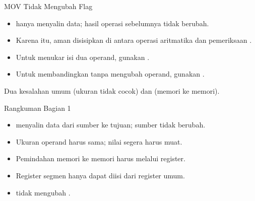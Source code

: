 \documentclass[aspectratio=169,11pt]{beamer}
\begin{document}
\begin{frame}{MOV Tidak Mengubah Flag}
\small
\begin{itemize}
    \item {} hanya menyalin data;  hasil operasi
          sebelumnya tidak berubah.

    \vspace{0.18em}
    \item Karena itu,  aman disisipkan di antara operasi
          aritmatika dan pemeriksaan .

    \vspace{0.18em}
    \item Untuk menukar isi dua operand, gunakan .

    \vspace{0.18em}
    \item Untuk membandingkan tanpa mengubah operand, gunakan
          .
\end{itemize}

\vspace{0.3em}
\begin{alertblock}{Dua kesalahan umum}
\small {} (ukuran tidak cocok) dan
 (memori ke memori).
\end{alertblock}
\end{frame}

\begin{frame}{Rangkuman Bagian 1}
\small
\begin{itemize}
    \item {} menyalin data dari sumber ke tujuan; sumber
          tidak berubah.

    \vspace{0.15em}
    \item Ukuran operand harus sama; nilai segera harus muat.

    \vspace{0.15em}
    \item Pemindahan memori ke memori harus melalui register.

    \vspace{0.15em}
    \item Register segmen hanya dapat diisi dari register umum.

    \vspace{0.15em}
    \item {} tidak mengubah .
\end{itemize}
\end{frame}
\end{document}
